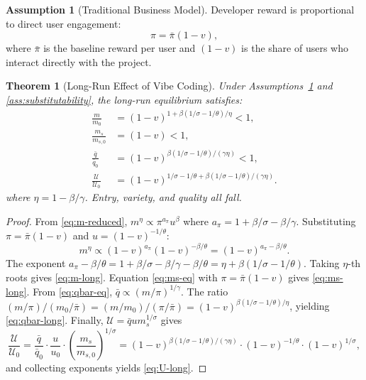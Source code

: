 \documentclass[11pt,a4paper]{article}
\newtheorem{theorem}{Theorem}
\theoremstyle{definition}
\newtheorem{assumption}{Assumption}
\theoremstyle{remark}
\begin{document}
\begin{assumption}[Traditional Business Model]\label{ass:traditional}
Developer reward is proportional to direct user engagement:
$$
\pi = \bar{\pi}(1-v),
$$
where $\bar{\pi}$ is the baseline reward per user and $(1-v)$ is the share of users who interact directly with the project.
\end{assumption}

\begin{theorem}[Long-Run Effect of Vibe Coding]\label{thm:long-run}
Under Assumptions~\ref{ass:traditional} and \ref{ass:substitutability}, the long-run equilibrium satisfies:
\begin{align}
\frac{m}{m_0} &= (1-v)^{1 + \beta(1/\sigma - 1/\theta)/\eta}<1, \label{eq:m-long}\\
\frac{m_s}{m_{s,0}} &= (1-v)<1, \label{eq:ms-long}\\
\frac{\bar{q}}{\bar{q}_0} &= (1-v)^{\beta(1/\sigma - 1/\theta)/(\gamma\eta)}<1, \label{eq:qbar-long}\\
\frac{\mathcal{U}}{\mathcal{U}_0} &= (1-v)^{1/\sigma - 1/\theta + \beta(1/\sigma - 1/\theta)/(\gamma\eta)}. \label{eq:U-long}
\end{align}
where $\eta = 1 - \beta/\gamma$. Entry, variety, and quality all fall.
\end{theorem}

\begin{proof}
From \eqref{eq:m-reduced}, $m^{\eta} \propto \pi^{a_\pi} u^{\beta}$ where $a_\pi = 1 + \beta/\sigma - \beta/\gamma$. Substituting $\pi = \bar{\pi}(1-v)$ and $u = (1-v)^{-1/\theta}$:
$$
m^{\eta} \propto (1-v)^{a_\pi} (1-v)^{-\beta/\theta} = (1-v)^{a_\pi - \beta/\theta}.
$$
The exponent $a_\pi - \beta/\theta = 1 + \beta/\sigma - \beta/\gamma - \beta/\theta = \eta + \beta(1/\sigma - 1/\theta)$. Taking $\eta$-th roots gives \eqref{eq:m-long}. Equation \eqref{eq:ms-eq} with $\pi = \bar{\pi}(1-v)$ gives \eqref{eq:ms-long}. From \eqref{eq:qbar-eq}, $\bar{q} \propto (m/\pi)^{1/\gamma}$. The ratio $(m/\pi)/(m_0/\bar{\pi}) = (m/m_0)/(\pi/\bar{\pi}) = (1-v)^{\beta(1/\sigma - 1/\theta)/\eta}$, yielding \eqref{eq:qbar-long}. Finally, $\mathcal{U} = \bar{q} u m_s^{1/\sigma}$ gives
$$
\frac{\mathcal{U}}{\mathcal{U}_0} = \frac{\bar{q}}{\bar{q}_0} \cdot \frac{u}{u_0} \cdot \left(\frac{m_s}{m_{s,0}}\right)^{1/\sigma} = (1-v)^{\beta(1/\sigma - 1/\theta)/(\gamma\eta)} \cdot (1-v)^{-1/\theta} \cdot (1-v)^{1/\sigma},
$$
and collecting exponents yields \eqref{eq:U-long}.
\end{proof}
\end{document}
